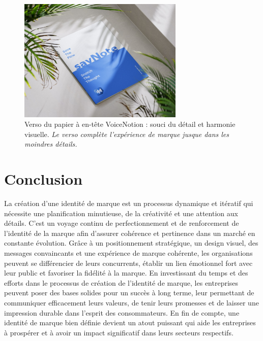 \begin{figure}[H]
    \centering
    \includegraphics[width=0.7\textwidth]{docs/visual-indentity/pictures/pappier-back.jpg}
    \caption{Verso du papier à en-tête VoiceNotion : souci du détail et harmonie visuelle. \newline\textit{Le verso complète l'expérience de marque jusque dans les moindres détails.}}
\end{figure}



\section{Conclusion}
La création d'une identité de marque est un processus dynamique et itératif qui nécessite une planification minutieuse, de la créativité et une attention aux détails. C'est un voyage continu de perfectionnement et de renforcement de l'identité de la marque afin d'assurer cohérence et pertinence dans un marché en constante évolution. Grâce à un positionnement stratégique, un design visuel, des messages convaincants et une expérience de marque cohérente, les organisations peuvent se différencier de leurs concurrents, établir un lien émotionnel fort avec leur public et favoriser la fidélité à la marque. En investissant du temps et des efforts dans le processus de création de l'identité de marque, les entreprises peuvent poser des bases solides pour un succès à long terme, leur permettant de communiquer efficacement leurs valeurs, de tenir leurs promesses et de laisser une impression durable dans l'esprit des consommateurs. En fin de compte, une identité de marque bien définie devient un atout puissant qui aide les entreprises à prospérer et à avoir un impact significatif dans leurs secteurs respectifs.

\vspace{1cm}
\begin{center}
\end{center}

